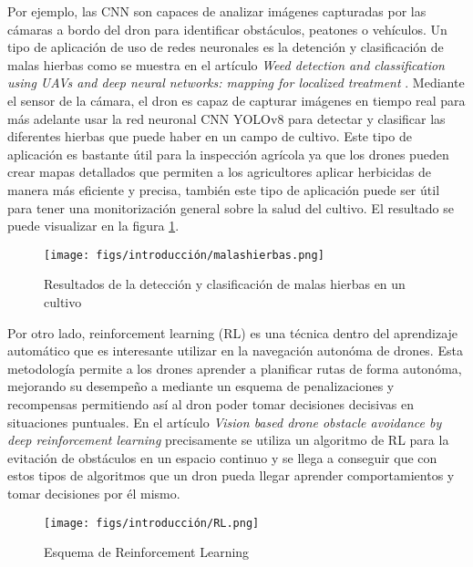 Por ejemplo, las CNN son capaces de analizar imágenes capturadas por las cámaras a bordo del dron para identificar obstáculos, 
peatones o vehículos. Un tipo de aplicación de uso de redes neuronales es la detención y clasificación de malas hierbas como se muestra 
en el artículo \textit{Weed detection and classification using UAVs and deep neural networks: mapping for localized treatment} \cite{CSIC}. Mediante el sensor de la cámara, el dron es capaz de capturar imágenes en tiempo real 
para más adelante usar la red neuronal CNN YOLOv8 \cite{Ultralytics_YOLOv8} para detectar y clasificar las diferentes hierbas que puede haber en un campo de cultivo. Este tipo de aplicación es bastante útil para la inspección
agrícola ya que los drones pueden crear mapas detallados que permiten a los agricultores aplicar herbicidas de manera más eficiente y precisa, también este tipo de aplicación puede
ser útil para tener una monitorización general sobre la salud del cultivo. El resultado se puede visualizar en la figura \ref{fig:malas hierbas}.\newline 

\begin{figure} [H]
  \begin{center}
    \texttt{[image: figs/introducción/malashierbas.png]}
  \end{center}
  \caption{Resultados de la detección y clasificación de malas hierbas en un cultivo \cite{CSIC}}
  \label{fig:malas hierbas}
\end{figure}

Por otro lado, reinforcement learning (RL) \cite{6025669} es una técnica dentro del aprendizaje automático que es interesante utilizar en la navegación autonóma de drones. Esta metodología permite
a los drones aprender a planificar rutas de forma autonóma, mejorando su desempeño a mediante un esquema de penalizaciones y recompensas permitiendo
así al dron poder tomar decisiones decisivas en situaciones puntuales. En el artículo \textit{Vision based drone obstacle avoidance by deep
reinforcement learning} \cite{ai2030023} precisamente se utiliza un algoritmo de RL para la evitación de obstáculos en un espacio continuo y se llega a conseguir que con estos
tipos de algoritmos que un dron pueda llegar aprender comportamientos y tomar decisiones por él mismo. 

\begin{figure} [H]
  \begin{center}
    \texttt{[image: figs/introducción/RL.png]}
  \end{center}
  \caption{Esquema de Reinforcement Learning \cite{BecomingHuman_RL_Basics}}
  \label{fig:Reinforcement Learning}
\end{figure}\



